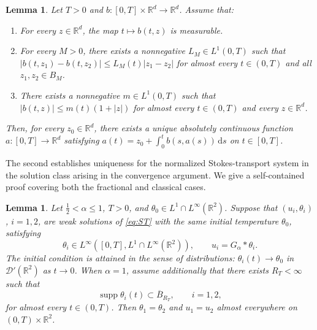 \documentclass[reqno,11pt,a4paper]{amsart}
\newtheorem{lemma}[theorem]{Lemma}
\newcommand{\dd}{\mathrm{d}}
\begin{document}
\begin{lemma}\label{lem:Caratheodory-Lipschitz}
Let $T>0$ and
$b:[0,T]\times\mathbb R^d\to\mathbb R^d$.
Assume that:
\begin{enumerate}
\item
For every $z\in\mathbb R^d$,
the map $t\mapsto b(t,z)$ is measurable.

\item
For every $M>0$, there exists a nonnegative
$L_M\in L^1(0,T)$ such that
$|b(t,z_1)-b(t,z_2)| \leq L_M(t)|z_1-z_2|$
for almost every $t\in(0,T)$
and all $z_1,z_2\in B_M$.

\item
There exists a nonnegative $m\in L^1(0,T)$ such that
$|b(t,z)|\leq m(t)(1+|z|)$ 
for almost every $t\in(0,T)$
and every $z\in\mathbb R^d$.
\end{enumerate}

Then, for every $z_0\in\mathbb R^d$,
there exists a unique absolutely continuous function
$a:[0,T]\to\mathbb R^d$ satisfying
$a(t)=z_0+\int_0^t b(s,a(s))\,\dd s$ on $t\in[0,T]$.
\end{lemma}

The second establishes uniqueness for the normalized
Stokes-transport system in the solution class
arising in the convergence argument.
We give a self-contained proof covering both
the fractional and classical cases.

\begin{lemma}\label{lem:ST-uniqueness}
Let $\frac12<\alpha\leq1$, $T>0$, and
$\theta_0\in L^1\cap L^\infty(\mathbb R^2)$.
Suppose that $(u_i,\theta_i)$, $i=1,2$, are weak solutions
of \eqref{eq:ST} with the same initial temperature
$\theta_0$, satisfying
\[
  \theta_i\in
  L^\infty([0,T],L^1\cap L^\infty(\mathbb R^2)),
  \qquad
  u_i=G_\alpha*\theta_i.
\]
The initial condition is attained in the sense of
distributions:
$\theta_i(t)\to\theta_0$ in $\mathcal D'(\mathbb R^2)$
as $t\rightarrow0$. When $\alpha=1$, assume additionally that there exists
$R_T<\infty$ such that
\[
  \operatorname{supp}\theta_i(t)
  \subset\overline B_{R_T},
  \qquad i=1,2,
\]
for almost every $t\in(0,T)$.
Then $\theta_1=\theta_2$ and $u_1=u_2$
almost everywhere on $(0,T)\times\mathbb R^2$.
\end{lemma}
\end{document}
